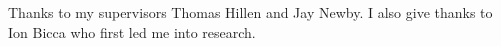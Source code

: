\documentclass[\main/thesis.tex]{subfiles}
\begin{document}
\begin{acknowledgements} 
Thanks to my supervisors Thomas Hillen and Jay Newby. I also give thanks to Ion 
Bicca who first led me into research.
\end{acknowledgements}
\end{document}
